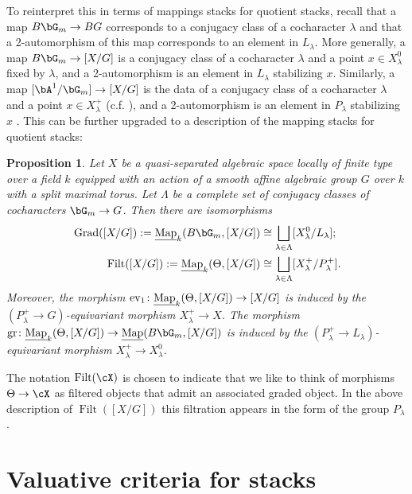 \documentclass[a4paper]{amsart}
\numberwithin{equation}{section}
\theoremstyle{plain}
\newtheorem{prop}[thm]{Proposition}
\theoremstyle{definition}
\DeclareMathOperator{\ev}{ev}
\DeclareMathOperator{\Filt}{Filt}
\newcommand{\uMap}{\underline{{\rm Map}}}
\DeclareMathOperator{\Grad}{Grad}
\DeclareMathOperator{\gr}{gr}
\newcommand{\co}{\colon}
\begin{document}
{To reinterpret this in terms of mappings stacks for quotient stacks, recall that a map $B\bG_m \to BG$ corresponds to a conjugacy class of a cocharacter $\lambda$ and that a 2-automorphism of this map corresponds to an element in $L_{\lambda}$.  More generally, a map $B\bG_m \to [X/G]$ is a conjugacy class of a cocharacter $\lambda$ and a point $x \in X^0_{\lambda}$ fixed by $\lambda$, and a 2-automorphism is an element in $L_{\lambda}$ stabilizing $x$.  Similarly, a map $[\bA^1/\bG_m] \to [X/G]$ is the data of a conjugacy class of a cocharacter $\lambda$ and a point $x \in X^+_{\lambda}$ (c.f. \cite[Lem.~1.6]{heinloth-stability}), and a 2-automorphism is an element in $P_{\lambda}$ stabilizing $x$ . This can be further upgraded to a description of the mapping stacks for quotient stacks:}
\begin{prop} \cite[Thm.~1.4.8]{hlinstability}  \label{P:theta-description}
	Let $X$ be a quasi-separated algebraic space locally of finite type over a field $k$ equipped with an action of a smooth {affine} algebraic group $G$ over $k$ with a split maximal torus. Let $\Lambda$ be a complete set of conjugacy classes of cocharacters $\bG_m \to G$. Then there are isomorphisms
	$$\begin{aligned} \,
	\Grad([X/G]):=\uMap_k(B\bG_m, [X/G])		&\cong \bigsqcup_{\lambda \in \Lambda} [X^0_{\lambda}/L_{\lambda}]; \\
	\Filt([X/G]):=\uMap_k(\Theta, [X/G] ) 	   	&\cong  \bigsqcup_{\lambda \in \Lambda} [X^+_{\lambda}/P^+_{\lambda}].
	\end{aligned}$$  
	Moreover, the morphism $\ev_1 \co \uMap_k(\Theta, [X/G]) \to [X/G]$ is induced by the $(P^+_{\lambda} \to G)$-equivariant morphism $X^+_{\lambda} \to X$.  The morphism $\gr \co \uMap_k(\Theta,[X/G]) \to \uMap(B\bG_m, [X/G])$  is induced by the $(P^+_{\lambda} \to L_{\lambda})$-equivariant morphism $X^+_{\lambda} \to X^0_{\lambda}$.
\end{prop}

The notation $\Filt(\cX)$ is chosen to indicate that we like to think of morphisms $\Theta \to \cX$ as filtered objects that admit an associated graded object. In the above description of $\Filt([X/G])$ this filtration appears in the form of the group $P_\lambda$.




\section{Valuative criteria for stacks}
\end{document}
